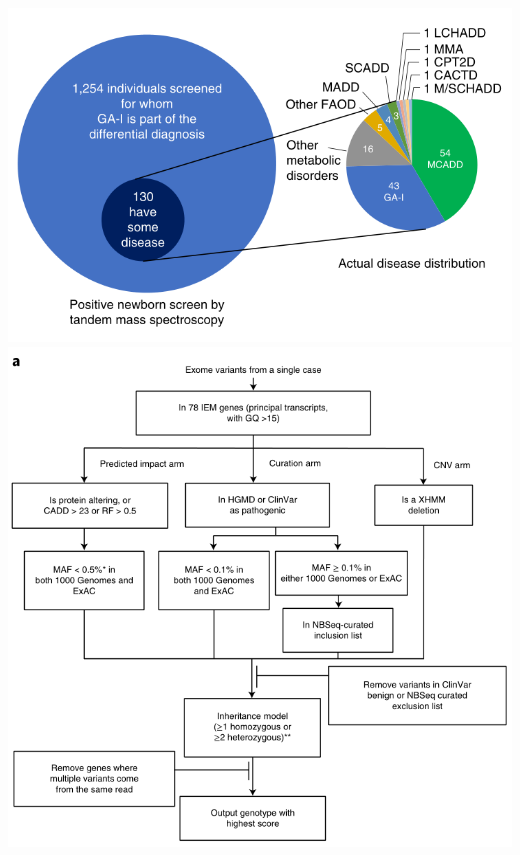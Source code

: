 \documentclass[plain,basic]{inVerba-notes}
\begin{document}
\begin{center}
    \includegraphics[scale=0.44]{images/fig-6-1.png} 
    \includegraphics[scale=0.63]{images/fig-6-2a.png} 
\end{center}

\nocite{adhikari2020role}


\end{document}
